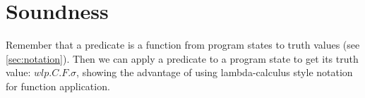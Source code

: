 

\section{Soundness}\label{sec:sound} 
Remember that a predicate is a function from program states to truth values (see \autoref{sec:notation}). 
Then we can apply a predicate to a program state to get its truth value: $wlp.C.F.\sigma$, showing the advantage of using lambda-calculus style notation for function application. 

